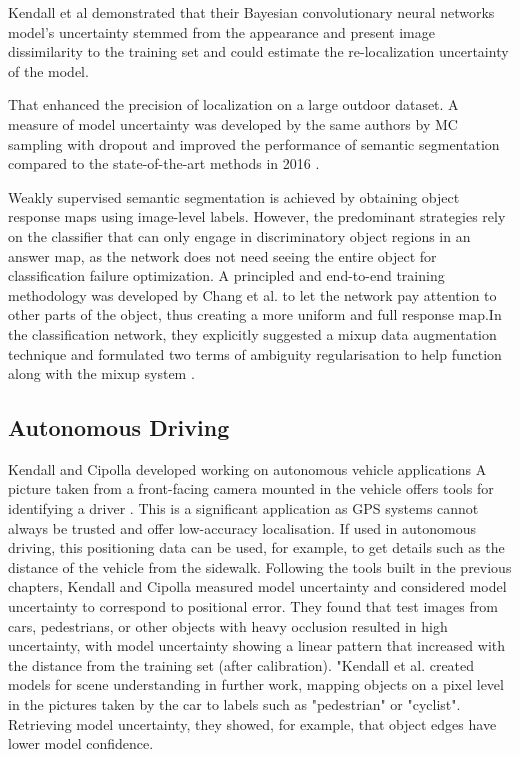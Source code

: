 \documentclass[journal]{IEEEtran}
\begin{document}
Kendall et al demonstrated that their Bayesian convolutionary neural networks model's uncertainty stemmed from the appearance
and present image dissimilarity to the training set and could estimate the re-localization uncertainty of the model\cite{kendall2017uncertainties}.

That enhanced the precision of
localization on a large outdoor dataset.
A measure of model uncertainty was developed by the same authors by MC sampling with
dropout and improved the performance of semantic segmentation compared to the state-of-the-art methods in 2016 \cite{loquercio2020general}. 

Weakly supervised semantic segmentation is achieved by
obtaining object response maps using image-level labels.
However, the predominant strategies rely on the classifier that can only engage in
discriminatory object regions in an answer map, as the network does not need seeing the entire object
for classification failure optimization\cite{petschnigg2021uncertainty}.
A principled and end-to-end training methodology was developed by Chang et al. to let the network
pay attention to other parts of the object, thus creating a more uniform and full response map.In the classification network, they explicitly suggested a mixup data augmentation technique and
formulated two terms of ambiguity regularisation to help function along with the mixup system \cite{petschnigg2021uncertainty}. 

\subsection{Autonomous Driving}
Kendall and Cipolla developed
working on autonomous vehicle applications
A picture taken from a front-facing camera mounted
in the vehicle offers tools for identifying a driver \cite{kendall2017uncertainties}.
This is a significant application as GPS systems
cannot always be trusted and offer low-accuracy localisation.
If used in autonomous driving, this positioning data can be used, for example\cite{petschnigg2021uncertainty},
to get details such as the distance of the vehicle from the sidewalk.
Following the tools built in the previous chapters, Kendall and Cipolla
measured model uncertainty and considered model uncertainty to correspond to positional error.  They found that test images from cars, pedestrians, or other objects with heavy occlusion resulted in high uncertainty,
with model uncertainty showing a linear pattern that increased with the distance from the training set (after calibration)\cite{petschnigg2021uncertainty}.
"Kendall et al. created models for scene understanding in further work, mapping objects on a pixel level in the pictures taken by the car to labels such as "pedestrian" or "cyclist".
Retrieving model uncertainty, they showed, for example,
that object edges have lower model confidence\cite{kendall2017uncertainties}.
\end{document}
